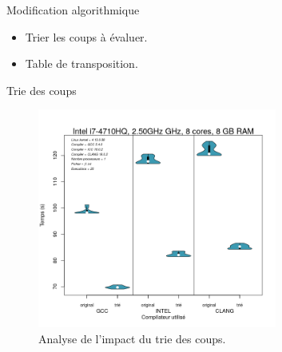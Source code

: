 \documentclass{beamer}
\begin{document}
\begin{frame}{Modification algorithmique}

\begin{itemize}
  \item
    Trier les coups à évaluer.
  \item
    Table de transposition.
 \end{itemize}	
\end{frame}

\begin{frame}{Trie des coups}
	\begin{figure}
      \includegraphics[width=0.7\textwidth]{trie.png}
      \caption{Analyse de l'impact du trie des coups.\label{Fig:trie}}
	\end{figure}
\end{frame}
\end{document}
